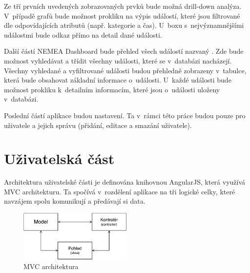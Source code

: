 Ze tří prvních uvedených zobrazovaných prvků bude možná drill-down analýza. V~případě grafů bude možnost prokliku na výpis událostí, které jsou filtrované dle odpovídajících atributů (např. kategorie a čas). U~boxu s~nejvýznamnějšími událostmi bude odkaz přímo na detail dané události.

Další částí NEMEA Dashboard bude přehled všech událostí nazvaný . Zde bude možnost vyhledávat a třídit všechny události, které se v~databázi nacházejí. Všechny vyhledané a vyfiltrované události budou přehledně zobrazeny v~tabulce, která bude obsahovat základní informace o~události. U~každé události bude možnost prokliku k~detailním informacím, které jsou o~události uloženy v~databázi.

Poslední částí aplikace budou nastavení. Ta v~rámci této práce budou pouze pro uživatele a jejich správu (přidání, editace a smazání uživatele).

\section{Uživatelská část}
\label{sec:mvc}
Architektura uživatelské části je definována knihovnou AngularJS, která využívá MVC architekturu. Ta spočívá v~rozdělení aplikace na tři logické celky, které navzájem spolu komunikují a předávají si data.

\begin{figure}[ht]
    \centering
    \includegraphics[width=0.5\textwidth]{fig/mvc.pdf}
    \caption{MVC architektura} \label{fig:mvc}
\end{figure}

